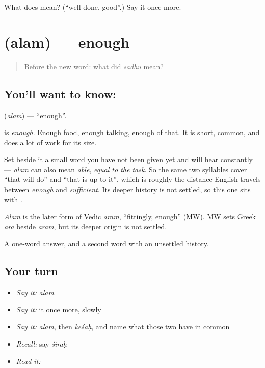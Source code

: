 \begin{tcolorbox}[breakable,colback=teal!4,colframe=teal!35!black,title={Before you move on}]
What does  mean? (\textquotedblleft{}well done, good\textquotedblright{}.) Say it once more.
\end{tcolorbox}
\section[\texorpdfstring{\sk{अलम्} (alam)}{अलम् (alam)}]{ (alam) — enough}

\label{lesson:SA-C27-enough}



\begin{quote}
Before the new word: what did \emph{sādhu} mean?
\end{quote}

\subsection*{You'll want to know: }
\textbf{} (\emph{alam}) — \textquotedblleft{}enough\textquotedblright{}.

\textbf{} is \emph{enough}. Enough food, enough talking, enough of that. It is short, common, and does a lot of work for its size.

Set beside it a small word you have not been given yet and will hear constantly — \emph{alam} can also mean \emph{able}, \emph{equal to the task}. So the same two syllables cover \textquotedblleft{}that will do\textquotedblright{} and \textquotedblleft{}that is up to it\textquotedblright{}, which is roughly the distance English travels between \emph{enough} and \emph{sufficient}. Its deeper history is not settled, so this one sits with .

\begin{cousinweb}
\emph{Alam} is the later form of Vedic \emph{aram}, \textquotedblleft{}fittingly, enough\textquotedblright{} (MW). MW sets Greek \emph{ara} beside \emph{aram}, but its deeper origin is not settled.
\end{cousinweb}

\begin{grammarlens}[title={What you've built}]
A one-word answer, and a second word with an unsettled history.
\end{grammarlens}

\subsection*{Your turn}
\begin{itemize}
\raggedright
  \item \emph{Say it:} \emph{alam}
  \item \emph{Say it:} it once more, slowly
  \item \emph{Say it:} \emph{alam}, then \emph{keśaḥ}, and name what those two have in common
  \item \emph{Recall:} say \emph{śiraḥ}
  \item \emph{Read it:} \textbf{}
\end{itemize}

